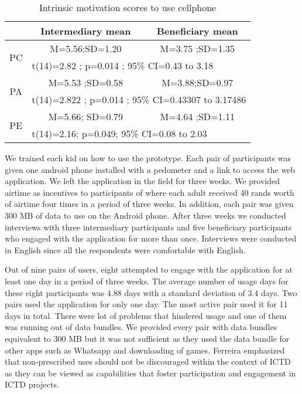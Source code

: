 \documentclass{sig-alternate}
\begin{document}
\begin{table}[h!]
  \begin{center}
    \caption{Intrinsic motivation scores to use cellphone}
    \label{table:intrcell}
	\begin{tabular}{|c|c|c|}
		\hline
		&Intermediary mean&Beneficiary mean\\
		\hline
		 \multirow{2}{*}{PC}&M=5.56;SD=1.20&M=3.75 ;SD=1.35\\\cline{2-3} 

		 &\multicolumn{2}{|l|}{t(14)=2.82 ; p=0.014 ; 95\% CI=0.43 to 3.18} \\
\hline
   		 \multirow{2}{*}{PA}&M=5.53 ;SD=0.58&M=3.88;SD=0.97\\\cline{2-3} 
		
		 &\multicolumn{2}{|l|}{t(14)=2.822 ; p=0.014 ; 95\% CI=0.43307 to 3.17486} \\
\hline

   		 \multirow{2}{*}{PE}&M=5.66; SD=0.79&M=4.64 ;SD=1.11\\\cline{2-3}
		
		 &\multicolumn{2}{|l|}{t(14)=2.16; p=0.049; 95\% CI=0.08 to 2.03} \\
\hline
		
	\end{tabular}
  \end{center}
\end{table}

We trained each kid on how to use the prototype. Each pair of participants was
given one android phone installed with a pedometer and a link to access the
web application. We left the application in the field for three weeks. We
provided airtime as incentives to participants of where each adult received 40
rands worth of airtime four times in a period of three weeks. In addition,
each pair was given 300 MB of data to use on the Android phone. After three
weeks we conducted interviews with three intermediary participants and five
beneficiary participants who engaged with the application for more than once.
Interviews were conducted in English since all the respondents were
comfortable with English.

Out of nine pairs of users, eight attempted to engage with the application for
at least one day in a period of three weeks. The average number of usage days
for these eight participants was 4.88 days with a standard deviation of  3.4
days. Two pairs used the application for only one day. The most active pair
used it for 11 days in total. There were lot of problems that hindered usage
and one of them was running out of data bundles. We provided every pair with
data bundles equivalent to 300 MB but it was not sufficient as they used the
data bundle for other apps such as Whatsapp and downloading of games.
Ferreira\cite{ferrplay2015} emphasized that non-prescribed uses should not be
discouraged within the context of ICTD as they can be viewed as  capabilities
that foster participation and engagement in ICTD projects.
\end{document}
